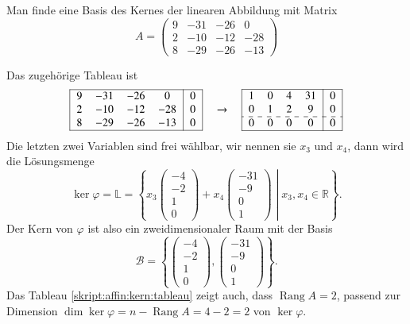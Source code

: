 \begin{beispiel}
Man finde eine Basis des Kernes der linearen Abbildung mit Matrix
\[
A=\begin{pmatrix}
    9& -31& -26&   0\\
    2& -10& -12& -28\\
    8& -29& -26& -13
\end{pmatrix}
\]
\smallskip

{\parindent0pt Das} zugehörige Tableau ist
\begin{equation}
\begin{tabular}{|>{$}c<{$}>{$}c<{$}>{$}c<{$}>{$}c<{$}|>{$}c<{$}|}
\hline
    9& -31& -26&   0&0\\
    2& -10& -12& -28&0\\
    8& -29& -26& -13&0\\
\hline
\end{tabular}
\quad\rightarrow\quad
\begin{tabular}{|>{$}c<{$}>{$}c<{$}>{$}c<{$}>{$}c<{$}|>{$}c<{$}|}
\hline
    1&   0&   4&  31&0\\
    0&   1&   2&   9&0\\
\hdashline
    0&   0&   0&   0&0\\
\hline
\end{tabular}
\label{skript:affin:kern:tableau}
\end{equation}
Die letzten zwei Variablen sind frei wählbar, wir nennen sie $x_3$ und $x_4$,
dann wird die Lösungsmenge
\[
\ker\varphi
=
\mathbb L
=
\left\{
\left.
x_3
\begin{pmatrix}
-4\\-2\\1\\0
\end{pmatrix}
+
x_4
\begin{pmatrix}
-31\\-9\\0\\1
\end{pmatrix}
\;
\right|
\;
x_3,x_4\in\mathbb R
\right\}.
\]
Der Kern von $\varphi$ ist also ein zweidimensionaler Raum mit der Basis
\[
\mathcal{B} = \left\{
\begin{pmatrix}
-4\\-2\\1\\0
\end{pmatrix},
\begin{pmatrix}
-31\\-9\\0\\1
\end{pmatrix}
\right\}.
\]
Das Tableau \eqref{skript:affin:kern:tableau} zeigt auch, dass
$\operatorname{Rang}A=2$,
passend zur Dimension $\dim\ker\varphi = n - \operatorname{Rang}A = 4-2=2$ von
$\ker\varphi$.
\end{beispiel}


